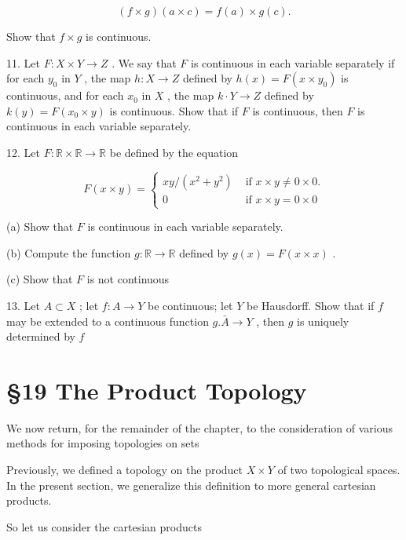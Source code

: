 \[
\left( {f \times  g}\right) \left( {a \times  c}\right)  = f\left( a\right)  \times  g\left( c\right) .
\]

Show that \(f \times  g\) is continuous.

11. Let \(F : X \times  Y \rightarrow  Z\) . We say that \(F\) is continuous in each variable separately if for each \({y}_{0}\) in \(Y\) , the map \(h : X \rightarrow  Z\) defined by \(h\left( x\right)  = F\left( {x \times  {y}_{0}}\right)\) is continuous, and for each \({x}_{0}\) in \(X\) , the map \(k \cdot  Y \rightarrow  Z\) defined by \(k\left( y\right)  = F\left( {{x}_{0} \times  y}\right)\) is continuous. Show that if \(F\) is continuous, then \(F\) is continuous in each variable separately.

12. Let \(F : \mathbb{R} \times  \mathbb{R} \rightarrow  \mathbb{R}\) be defined by the equation

\[
F\left( {x \times  y}\right)  = \left\{  \begin{array}{ll} {xy}/\left( {{x}^{2} + {y}^{2}}\right) & \text{ if }x \times  y \neq  0 \times  0. \\  0 & \text{ if }x \times  y = 0 \times  0 \end{array}\right.
\]

(a) Show that \(F\) is continuous in each variable separately.

(b) Compute the function \(g : \mathbb{R} \rightarrow  \mathbb{R}\) defined by \(g\left( x\right)  = F\left( {x \times  x}\right)\) .

(c) Show that \(F\) is not continuous

13. Let \(A \subset  X\) ; let \(f : A \rightarrow  Y\) be continuous; let \(Y\) be Hausdorff. Show that if \(f\) may be extended to a continuous function \(g.\bar{A} \rightarrow  Y\) , then \(g\) is uniquely determined by \(f\)

\section*{§19 The Product Topology}

We now return, for the remainder of the chapter, to the consideration of various methods for imposing topologies on sets

Previously, we defined a topology on the product \(X \times  Y\) of two topological spaces. In the present section, we generalize this definition to more general cartesian products.

So let us consider the cartesian products

